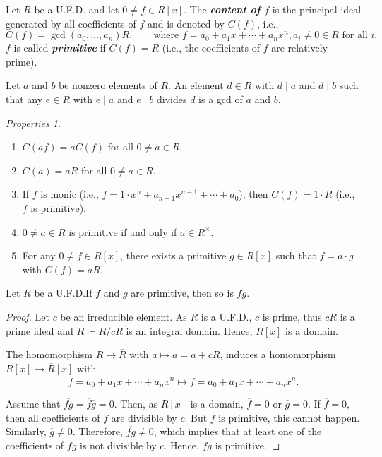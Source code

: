 \documentclass[twoside]{article}
\theoremstyle{remark}
\newtheorem*{properties}{Properties}
\newcounter{theorem}
\newcommand*\term[1]{\textbf{\textit{\mathversion{bold}#1}}}
\begin{document}
\begin{definition} 
  Let \(R\) be a U.F.D. and let \(0 \neq f \in R[x]\). The \term{content of \(f\)} is the principal ideal generated by all coefficients of \(f\) and is denoted by \(C(f)\), i.e.,
  \[ C(f) = \gcd(a_0, \dots, a_n) R, \qquad \text{where } f = a_0 + a_1x + \cdots + a_nx^n, a_i \neq 0 \in R \text{ for all \(i\)}. \]
  \(f\) is called \term{primitive} if \(C(f) = R\) (i.e., the coefficients of \(f\) are relatively prime).
\end{definition}

Let \(a\) and \(b\) be nonzero elements of \(R\). An element \(d \in R\) with \(d \mid a\) and \(d \mid b\) such that any \(e \in R\) with \(e \mid a\) and \(e \mid b\) divides \(d\) is a gcd of \(a\) and \(b\).

\begin{properties}
  \begin{enumerate}[label=\arabic*.]
    \item \(C(af) = aC(f)\) for all \(0 \neq a \in R\).
    \item \(C(a) = aR\) for all \(0 \neq a \in R\).
    \item If \(f\) is monic (i.e., \(f = 1 \cdot x^n + a_{n-1}x^{n-1} + \cdots + a_0\)), then \(C(f) = 1 \cdot R\) (i.e., \(f\) is primitive).
    \item \(0 \neq a \in R\) is primitive if and only if \(a \in R^\times\).
    \item For any \(0 \neq f \in R[x]\), there exists a primitive \(g \in R[x]\) such that \(f = a \cdot g\) with \(C(f) = aR\).
  \end{enumerate}
\end{properties}

\begin{lemma}[Gauss]
  Let \(R\) be a U.F.D.\@ If \(f\) and \(g\) are primitive, then so is \(fg\).
\end{lemma}

\begin{proof}
  Let \(c\) be an irreducible element. As \(R\) is a U.F.D., \(c\) is prime, thus \(cR\) is a prime ideal and \(\overline R \coloneq R/cR\) is an integral domain. Hence, \(\overline R[x]\) is a domain. \par
  The homomorphism \(R \to \overline R\) with \(a \mapsto \overline a = a + cR\), induces a homomorphism \(R[x] \to \overline R[x]\) with
  \[ f = a_0 + a_1x + \cdots + a_nx^n \mapsto \overline f = \overline{a_0} + \overline{a_1} x + \cdots + \overline{a_n} x^n. \] \par
  Assume that \(\overline{fg} = \overline f \overline g = 0\). Then, as \(R[x]\) is a domain, \(\overline f = 0\) or \(\overline g = 0\). If \(\overline f = 0\), then all coefficients of \(f\) are divisible by \(c\). But \(f\) is primitive, this cannot happen. Similarly, \(\overline g \neq 0\). Therefore, \(\overline{fg} \neq 0\), which implies that at least one of the coefficients of \(fg\) is not divisible by \(c\). Hence, \(fg\) is primitive.
\end{proof}
\end{document}
